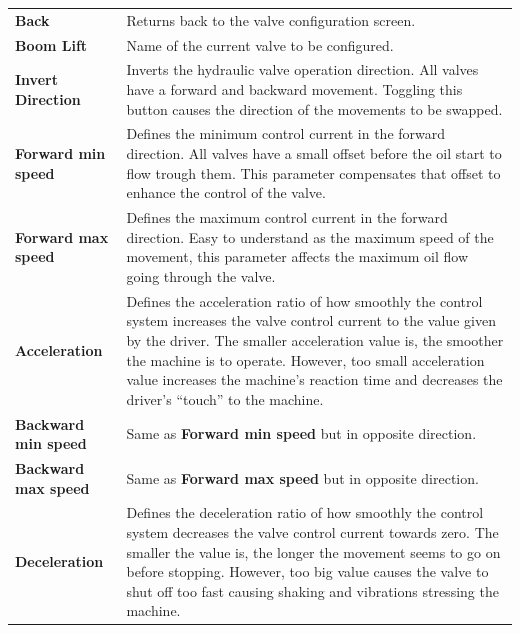\documentclass[12pt,a4paper,english]{uvmanual}
\begin{document}
\begin{tabular}{ L{0.2\textwidth} L{0.66\textwidth} }
\textbf{Back} & Returns back to the valve configuration screen. \\
\textbf{Boom Lift} & Name of the current valve to be configured. \\
\textbf{Invert Direction} & Inverts the hydraulic valve operation direction. All valves have a forward and backward movement. Toggling this button causes the direction of the movements to be swapped. \\
\textbf{Forward min speed} & Defines the minimum control current in the forward direction. All valves have a small offset before the oil start to flow trough them. This parameter compensates that offset to enhance the control of the valve. \\
\textbf{Forward max speed} & Defines the maximum control current in the forward direction. Easy to understand as the maximum speed of the movement, this parameter affects the maximum oil flow going through the valve. \\
\textbf{Acceleration} & Defines the acceleration ratio of how smoothly the control system increases the valve control current to the value given by the driver. The smaller acceleration value is, the smoother the machine is to operate. However, too small acceleration value increases the machine's reaction time and decreases the driver's ``touch'' to the machine. \\
\textbf{Backward min speed} & Same as \textbf{Forward min speed} but in opposite direction. \\
\textbf{Backward max speed} & Same as \textbf{Forward max speed} but in opposite direction. \\
\textbf{Deceleration} & Defines the deceleration ratio of how smoothly the control system decreases the valve control current towards zero. The smaller the value is, the longer the movement seems to go on before stopping. However, too big value causes the valve to shut off too fast causing shaking and vibrations stressing the machine. \\
\end{tabular}


\end{document}
